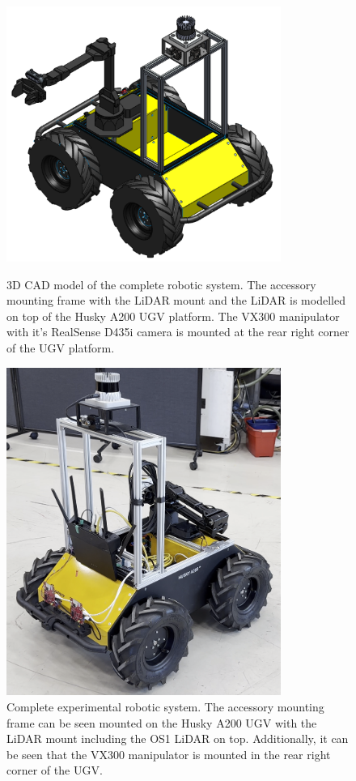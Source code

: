 \begin{figure}[htp]
  \centering
  \begin{minipage}[b]{0.49\textwidth}
    \centering
    \includegraphics[width = 0.8\textwidth]{Figures/husky_completed.pdf}
    \caption{3D CAD model of the complete robotic system. The accessory mounting frame with the LiDAR mount and the LiDAR is modelled on top of the Husky A200 UGV platform. The VX300 manipulator with it's RealSense D435i camera is mounted at the rear right corner of the UGV platform.}
    \label{fig:M:H:CHS:CadHuskyComplete}
  \end{minipage}
  \hfill
  \begin{minipage}[b]{0.49\textwidth}
    \centering
    \includegraphics[width = 0.8\textwidth]{Figures/figHuskyComplete.png}
    \caption{Complete experimental robotic system. The accessory mounting frame can be seen mounted on the Husky A200 UGV with the LiDAR mount including the OS1 LiDAR on top. Additionally, it can be seen that the VX300 manipulator is mounted in the rear right corner of the UGV.}
    \label{fig:M:H:CHS:PhysHuskyComplete}
  \end{minipage}
\end{figure}

